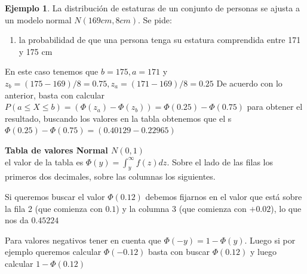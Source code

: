 \documentclass[]{book}
\theoremstyle{plain}
\theoremstyle{definition}
\newtheorem{example}[theorem]{Ejemplo}
\theoremstyle{definition} %
\begin{document}
\begin{example}
  La distribución de estaturas de un conjunto de personas se ajusta a un
modelo normal \(N(169cm,8cm)\). Se pide:
\begin{enumerate}
  \item la probabilidad de que una persona tenga su estatura comprendida entre 171 y 175 cm
\end{enumerate}

En este caso tenemos que \(b = 175, a =171\) y
\(z_b = (175-169)/8=0.75, z_a = (171-169)/8=0.25\) De acuerdo con
lo anterior, basta
con calcular
\(P(a\leq X\leq b) = (\Phi(z_a) - \Phi(z_b))= \Phi(0.25) - \Phi(0.75)\)
para obtener el resultado, buscando los valores en la tabla obtenemos que el s
\(\Phi(0.25) - \Phi(0.75) =   (0.40129 - 0.22965)\) 

\end{example}


\newpage


\textbf{Tabla de valores Normal \(N(0,1)\)}\\
el valor de la tabla es \(\Phi(y) = \int^{\infty}_{y} f(z)dz\). Sobre el
lado de las filas los primeros dos decimales, sobre las columnas los
siguientes.

Si queremos buscar el valor \(\Phi(0.12)\) debemos fijarnos en el valor
que está sobre la fila 2 (que comienza con \(0.1\)) y la columna 3 (que
comienza con \(+0.02\)), lo que nos da \(0.45224\)

Para valores negativos tener en cuenta que \(\Phi(-y) = 1-\Phi(y)\).
Luego si por ejemplo queremos calcular \(\Phi(-0.12)\) basta con buscar
\(\Phi(0.12)\) y luego calcular \(1-\Phi(0.12)\)\\
\end{document}
